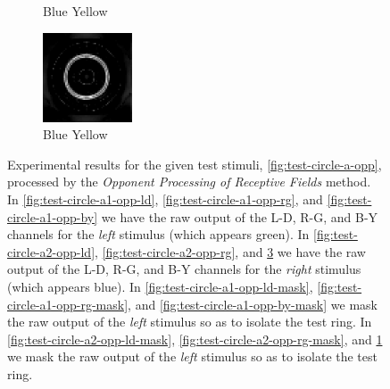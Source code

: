 \documentclass[journal,onecolumn]{IEEEtran}
\begin{document}
{\begin{figure}[H]
\begin{subfigure}[b]{0.25\textwidth}
            \caption{Blue Yellow}
            \label{fig:test-circle-a2-opp-by-mask}
    \end{subfigure}%
    \begin{subfigure}[b]{0.25\textwidth}
            \centering
            \includegraphics[width=100px, frame]{test-circle-a2-opp-by}
            \caption{Blue Yellow}
            \label{fig:test-circle-a2-opp-by}
    \end{subfigure}
    \caption{Experimental results for the given test stimuli, \ref{fig:test-circle-a-opp}, processed by the \textit{Opponent Processing of Receptive Fields} method. In \ref{fig:test-circle-a1-opp-ld}, \ref{fig:test-circle-a1-opp-rg}, and \ref{fig:test-circle-a1-opp-by} we have the raw output of the L-D, R-G, and B-Y channels for the \textit{left} stimulus (which appears green). In \ref{fig:test-circle-a2-opp-ld}, \ref{fig:test-circle-a2-opp-rg}, and \ref{fig:test-circle-a2-opp-by} we have the raw output of the L-D, R-G, and B-Y channels for the \textit{right} stimulus (which appears blue). In \ref{fig:test-circle-a1-opp-ld-mask}, \ref{fig:test-circle-a1-opp-rg-mask}, and \ref{fig:test-circle-a1-opp-by-mask} we mask the raw output of the \textit{left} stimulus so as to isolate the test ring. In \ref{fig:test-circle-a2-opp-ld-mask}, \ref{fig:test-circle-a2-opp-rg-mask}, and \ref{fig:test-circle-a2-opp-by-mask} we mask the raw output of the \textit{left} stimulus so as to isolate the test ring.}
\end{figure}
\clearpage
}
\end{document}

